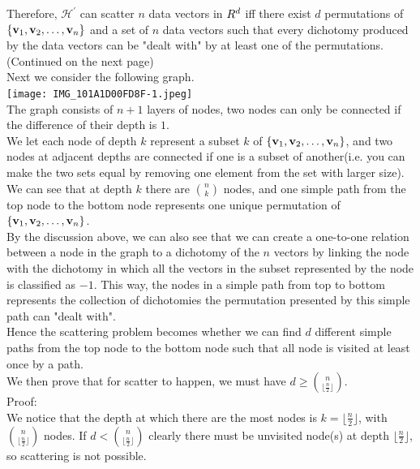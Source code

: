 \documentclass[11pt]{article}
\let\mathbb\relax
\theoremstyle{definition}
\begin{document}
Therefore, $\mathcal{H}^\prime$ can scatter $n$ data vectors in $\mathbb{R}^d$ iff there exist $d$ permutations of $\{\vb{v}_1, \vb{v}_2,\dots,\vb{v}_n\}$ and a set of $n$ data vectors such that every dichotomy produced by the data vectors can be "dealt with" by at least one of the permutations. \\
(Continued on the next page)\\
\newpage
Next we consider the following graph.\\
\texttt{[image: IMG\_101A1D00FD8F-1.jpeg]}\\
The graph consists of $n + 1$ layers of nodes, two nodes can only be connected if the difference of their depth is $1$. \\ 
We let each node of depth $k$ represent a subset $k$ of $\{\vb{v}_1, \vb{v}_2,\dots,\vb{v}_n\}$, and two nodes at adjacent depths are connected if one is a subset of another(i.e. you can make the two sets equal by removing one element from the set with larger size). \\ 
 We can see that at depth $k$ there are ${n\choose k}$ nodes, and one simple path from the top node to the bottom node represents one unique permutation of $\{\vb{v}_1, \vb{v}_2,\dots,\vb{v}_n\}$. \\ 
 By the discussion above, we can also see that we can create a one-to-one relation between a node in the graph to a dichotomy of the $n$ vectors by linking the node with the dichotomy in which all the vectors in the subset represented by the node is classified as $-1$. This way, the nodes in a simple path from top to bottom represents the collection of dichotomies the permutation presented by this simple path can "dealt with". \\
 Hence the scattering problem becomes whether we can find $d$ different simple paths from the top node to the bottom node such that all node is visited at least once by a path. \\
 \medbreak
 We then prove that for scatter to happen, we must have $d \geq {n\choose \lfloor\frac{n}{2}\rfloor}$. \\
 Proof: \\
 We notice that the depth at which there are the most nodes is $k = \lfloor\frac{n}{2}\rfloor$, with ${n\choose \lfloor\frac{n}{2}\rfloor}$ nodes. If $d < {n\choose \lfloor\frac{n}{2}\rfloor}$ clearly there must be unvisited node(s) at depth $\lfloor\frac{n}{2}\rfloor$, so scattering is not possible. \\ 
\end{document}
